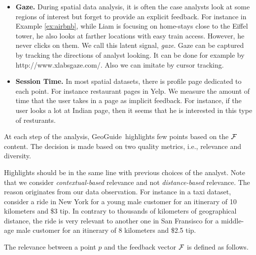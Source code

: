 \documentclass{vldb}
\newtheorem{definition}{Definition}
\newcommand{\framework}{{\sc GeoGuide}}
\begin{document}
\begin{itemize}[leftmargin=*]
\item {\bf Gaze.} During spatial data analysis, it is often the case analysts look at some regions of interest but forget to provide an explicit feedback. For instance in Example \ref{ex:airbnb}, while Liam is focusing on home-stays close to the Eiffel tower, he also looks at farther locations with easy train access. However, he never clicks on them. We call this latent signal, {\em gaze}. Gaze can be captured by tracking the directions of analyst looking. It can be done for example by http://www.xlabsgaze.com/. Also we can imitate by cursor tracking.
\item {\bf Session Time.} In most spatial datasets, there is profile page dedicated to each point. For instance restaurant pages in Yelp. We measure the amount of time that the user takes in a page as implicit feedback. For instance, if the user looks a lot at Indian page, then it seems that he is interested in this type of resturants.
\end{itemize}

At each step of the analysis, \framework\ highlights few points based on the ${\cal F}$ content. The decision is made based on two quality metrics, i.e., relevance and diversity. 

\vspace{5pt}
 Highlights should be in the same line with previous choices of the analyst. Note that we consider {\em contextual-based} relevance and not {\em distance-based} relevance. The reason originates from our data observation. For instance in a taxi dataset, consider a ride in New York for a young male customer for an itinerary of 10 kilometers and \$3 tip. In contrary to thousands of kilometers of geographical distance, the ride is very relevant to another one in San Fransisco for a middle-age male customer for an itinerary of 8 kilometers and \$2.5 tip.

The relevance between a point $p$ and the feedback vector ${\cal F}$ is defined as follows.

\end{document}
